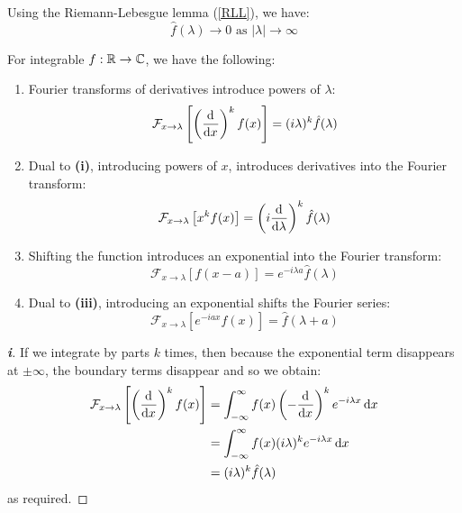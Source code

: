 \documentclass[../main.tex]{subfiles}
\begin{document}
Using the Riemann-Lebesgue lemma (\cref{RLL}), we have:
\begin{equation}
  \hat{f}(\lambda) \to 0 \text{ as } |\lambda| \to \infty \label{FTDecay}
\end{equation}
\begin{proposition}
  For integrable $f: \mathbb{R} \to \mathbb{C}$, we have the following: \label{fourierProps}
  \begin{enumerate}
    \item Fourier transforms of derivatives introduce powers of $\lambda$:
      \[
        \mathcal{F}_{x \to \lambda}\left[\left(\deriv{}{x}\right)^{k} f(x)\right] = (i \lambda)^{k} \hat{f}(\lambda)
      \]
    \item Dual to \textbf{(i)}, introducing powers of $x$, introduces derivatives into the Fourier transform:
      \[
        \mathcal{F}_{x \to \lambda}\left[x^k f(x)\right] = \left(i \deriv{}{\lambda}\right)^{k} \hat{f}(\lambda)
      \]
    \item Shifting the function introduces an exponential into the Fourier transform:
      \[
        \mathcal{F}_{x \to \lambda}\left[f(x - a)\right] = e^{-i \lambda a} \hat{f}(\lambda)
      \]
    \item Dual to \textbf{(iii)}, introducing an exponential shifts the Fourier series:
      \[
        \mathcal{F}_{x \to \lambda}\left[e^{-iax}f(x)\right] = \hat{f}(\lambda + a)
      \]
  \end{enumerate}
\end{proposition}
\begin{proof}[\textbf{i}]
  If we integrate by parts $k$ times, then because the exponential term disappears at $\pm \infty$, the boundary terms disappear and so we obtain:
  \begin{align*}
    \mathcal{F}_{x \to \lambda}\left[\left(\deriv{}{x}\right)^{k} f(x)\right] &= \int_{-\infty}^{\infty} f(x) \left(-\deriv{}{x}\right)^{k} e^{-i\lambda x} \d{x} \\
                                                                              &= \int_{-\infty}^{\infty}  f(x) (i \lambda)^{k} e^{-i\lambda x} \d{x} \\
                                                                              &= (i \lambda)^{k} \hat{f}(\lambda)
  \end{align*}
  as required.
\end{proof}
\end{document}
